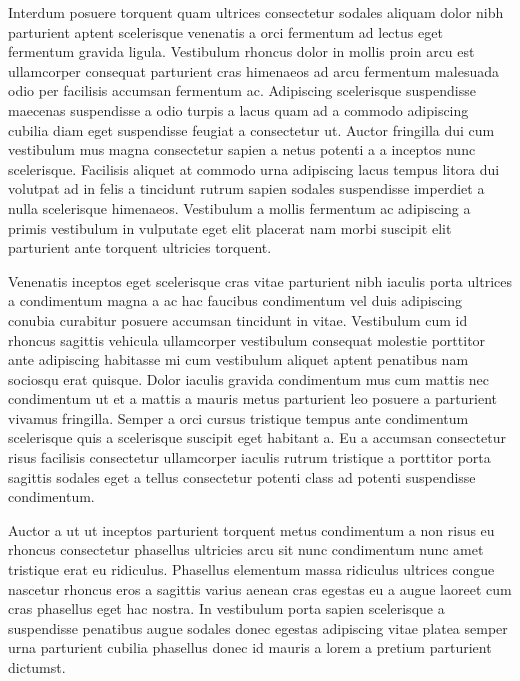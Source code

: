 Interdum posuere torquent quam ultrices consectetur sodales aliquam dolor nibh parturient aptent scelerisque venenatis a orci fermentum ad lectus eget fermentum gravida ligula. Vestibulum rhoncus dolor in mollis proin arcu est ullamcorper consequat parturient cras himenaeos ad arcu fermentum malesuada odio per facilisis accumsan fermentum ac. Adipiscing scelerisque suspendisse maecenas suspendisse a odio turpis a lacus quam ad a commodo adipiscing cubilia diam eget suspendisse feugiat a consectetur ut. Auctor fringilla dui cum vestibulum mus magna consectetur sapien a netus potenti a a inceptos nunc scelerisque. Facilisis aliquet at commodo urna adipiscing lacus tempus litora dui volutpat ad in felis a tincidunt rutrum sapien sodales suspendisse imperdiet a nulla scelerisque himenaeos. Vestibulum a mollis fermentum ac adipiscing a primis vestibulum in vulputate eget elit placerat nam morbi suscipit elit parturient ante torquent ultricies torquent.
\par
Venenatis inceptos eget scelerisque cras vitae parturient nibh iaculis porta ultrices a condimentum magna a ac hac faucibus condimentum vel duis adipiscing conubia curabitur posuere accumsan tincidunt in vitae. Vestibulum cum id rhoncus sagittis vehicula ullamcorper vestibulum consequat molestie porttitor ante adipiscing habitasse mi cum vestibulum aliquet aptent penatibus nam sociosqu erat quisque. Dolor iaculis gravida condimentum mus cum mattis nec condimentum ut et a mattis a mauris metus parturient leo posuere a parturient vivamus fringilla. Semper a orci cursus tristique tempus ante condimentum scelerisque quis a scelerisque suscipit eget habitant a. Eu a accumsan consectetur risus facilisis consectetur ullamcorper iaculis rutrum tristique a porttitor porta sagittis sodales eget a tellus consectetur potenti class ad potenti suspendisse condimentum.
\par
Auctor a ut ut inceptos parturient torquent metus condimentum a non risus eu rhoncus consectetur phasellus ultricies arcu sit nunc condimentum nunc amet tristique erat eu ridiculus. Phasellus elementum massa ridiculus ultrices congue nascetur rhoncus eros a sagittis varius aenean cras egestas eu a augue laoreet cum cras phasellus eget hac nostra. In vestibulum porta sapien scelerisque a suspendisse penatibus augue sodales donec egestas adipiscing vitae platea semper urna parturient cubilia phasellus donec id mauris a lorem a pretium parturient dictumst.
\par
